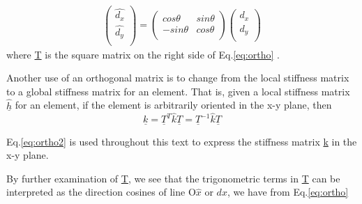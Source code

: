 \documentclass[12pt]{report}
\newcommand{\lab}[1]{
Eq.\ref{#1}
}
\begin{document}
\begin{eqnarray}
\left(\begin{array}{rr}
\hat{d_{x}} \\
\hat{d_{y}} \\
\end{array}\right) = \left(\begin{array}{rr}
cos\theta & sin\theta \\
-sin\theta & cos\theta  \\
\end{array}\right)
\left(\begin{array}{rr}
d_{x} \\
d_{y} \\
\end{array}\right)
\label{eq:ortho}\end{eqnarray}
where \underline{T} is the square matrix on the right side of \lab{eq:ortho}.


Another use of an orthogonal matrix is to change from the local
stiffness matrix to a global stiffness matrix for an element. That is,
given a local stiffness matrix $\hat{\underline{h}}$ for an element, if the
element is arbitrarily oriented in the x-y plane, then
\begin{equation}\underline{k}=\underline{T}^T \hat{k}\underline{T}=\underline{T}^{-1}\hat{k}\underline{T}\label{eq:ortho2}\end{equation}

\lab{eq:ortho2} is used throughout this text to express the
stiffness matrix \underline{k} in the x-y plane.

By further examination of \underline{T}, we see that the trigonometric terms in
\underline{T} can be interpreted as the direction cosines of line O$\hat{x}$ or
$d{x}$, we have from \lab{eq:ortho}
\end{document}
